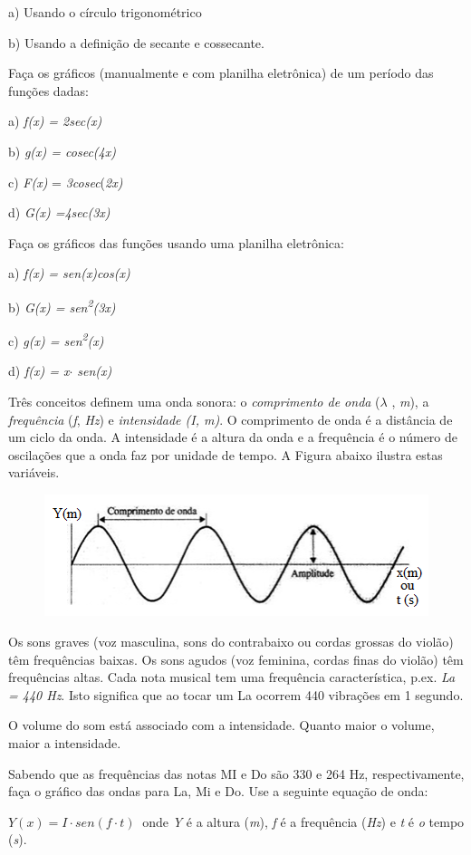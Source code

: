 \begin{exercicios}
a) Usando o círculo trigonométrico

b) Usando a definição de secante e cossecante.

\item Faça os gráficos (manualmente e com planilha eletrônica) de um período das funções dadas:

a) \textit{f(x) = 2sec(x)}

b) \textit{g(x) = cosec(4x)}

c) \textit{F(x) }= \textit{3cosec}(\textit{2x)\tab }

d)\textit{ G(x) =4sec(3x)\tab }

\item Faça os gráficos das funções usando uma planilha eletrônica:

a) \textit{f(x) = sen(x)cos(x)}

b) \textit{G(x) = sen\textsuperscript{2}(3x)}

c) \textit{g(x) = sen\textsuperscript{2}(x)}   

d) \textit{f(x) = x$ \cdot $  sen(x)}  

\exitem{} Três conceitos definem uma onda sonora: o \textit{comprimento de onda} ($ \lambda $ , \textit{m}), a \textit{frequência} (\textit{f}, \textit{Hz}) e \textit{intensidade (I, m)}. O comprimento de onda é a distância de um ciclo da onda. A intensidade é a altura da onda e a frequência é o número de oscilações que a onda faz por unidade de tempo. A Figura abaixo ilustra estas variáveis.

\begin{figure}[H]
    \begin{Center}
        \includegraphics[width=4.43in,height=1.4in]{capitulos/trigonometria_e_funcoes_trigonometricas/media/image44.png}
    \end{Center}
\end{figure}

Os sons graves (voz masculina, sons do contrabaixo ou cordas grossas do violão) têm frequências baixas. Os sons agudos (voz feminina, cordas finas do violão) têm frequências altas. Cada nota musical tem uma frequência característica, p.ex. \textit{La =  440  Hz}. Isto significa que ao tocar um La ocorrem 440 vibrações em 1 segundo.

O volume do som está associado com a intensidade. Quanto maior o volume, maior a intensidade.

Sabendo que as frequências das notas MI e Do são 330 e 264 Hz, respectivamente, faça o gráfico das ondas para La, Mi e Do. Use a seguinte equação de onda:

 \( Y \left( x \right) =I  \cdot sen \left( f \cdot t \right) ~  \)  onde \textit{Y} é a altura (\textit{m}), \textit{f} é a frequência (\textit{Hz}) e \textit{ t }é\textit{ o }tempo (\textit{s}).
\end{exercicios}

